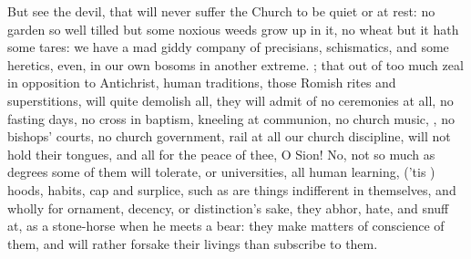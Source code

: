 {But see the devil, that will never suffer the Church to be quiet or at
rest: no garden so well tilled but some noxious weeds grow up in it, no
wheat but it hath some tares: we have a mad giddy company of
precisians, schismatics, and some heretics, even, in our own bosoms in
another extreme. ;
that out of too much zeal in opposition to Antichrist, human
traditions, those Romish rites and superstitions, will quite demolish
all, they will admit of no ceremonies at all, no fasting days, no cross
in baptism, kneeling at communion, no church music, \etc{}, no bishops'
courts, no church government, rail at all our church discipline, will
not hold their tongues, and all for the peace of thee, O Sion! No, not
so much as degrees some of them will tolerate, or universities, all
human learning, ('tis ) hoods, habits, cap and surplice,
such as are things indifferent in themselves, and wholly for ornament,
decency, or distinction's sake, they abhor, hate, and snuff at, as a
stone-horse when he meets a bear: they make matters of conscience of
them, and will rather forsake their livings than subscribe to them.

}
